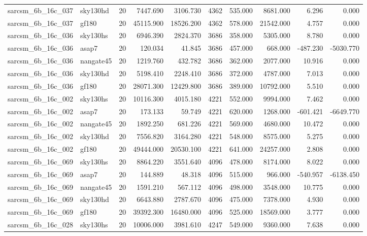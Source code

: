 \begin{longtable}{llrrrrrrrr}
sarcsm\_6b\_16c\_037 & sky130hd & 20 & 7447.690 & 3106.730 & 4362 & 535.000 & 8681.000 & 6.296 & 0.000 \\
sarcsm\_6b\_16c\_037 & gf180 & 20 & 45115.900 & 18526.200 & 4362 & 578.000 & 21542.000 & 4.757 & 0.000 \\
sarcsm\_6b\_16c\_036 & sky130hs & 20 & 6946.390 & 2824.370 & 3686 & 358.000 & 5305.000 & 8.780 & 0.000 \\
sarcsm\_6b\_16c\_036 & asap7 & 20 & 120.034 & 41.845 & 3686 & 457.000 & 668.000 & -487.230 & -5030.770 \\
sarcsm\_6b\_16c\_036 & nangate45 & 20 & 1219.760 & 432.782 & 3686 & 362.000 & 2077.000 & 10.916 & 0.000 \\
sarcsm\_6b\_16c\_036 & sky130hd & 20 & 5198.410 & 2248.410 & 3686 & 372.000 & 4787.000 & 7.013 & 0.000 \\
sarcsm\_6b\_16c\_036 & gf180 & 20 & 28071.300 & 12429.800 & 3686 & 389.000 & 10792.000 & 5.510 & 0.000 \\
sarcsm\_6b\_16c\_002 & sky130hs & 20 & 10116.300 & 4015.180 & 4221 & 552.000 & 9994.000 & 7.462 & 0.000 \\
sarcsm\_6b\_16c\_002 & asap7 & 20 & 173.133 & 59.749 & 4221 & 620.000 & 1268.000 & -601.421 & -6649.770 \\
sarcsm\_6b\_16c\_002 & nangate45 & 20 & 1892.250 & 681.226 & 4221 & 569.000 & 4680.000 & 10.472 & 0.000 \\
sarcsm\_6b\_16c\_002 & sky130hd & 20 & 7556.820 & 3164.280 & 4221 & 548.000 & 8575.000 & 5.275 & 0.000 \\
sarcsm\_6b\_16c\_002 & gf180 & 20 & 49444.000 & 20530.100 & 4221 & 641.000 & 24257.000 & 2.808 & 0.000 \\
sarcsm\_6b\_16c\_069 & sky130hs & 20 & 8864.220 & 3551.640 & 4096 & 478.000 & 8174.000 & 8.022 & 0.000 \\
sarcsm\_6b\_16c\_069 & asap7 & 20 & 144.889 & 48.318 & 4096 & 515.000 & 966.000 & -540.957 & -6138.450 \\
sarcsm\_6b\_16c\_069 & nangate45 & 20 & 1591.210 & 567.112 & 4096 & 498.000 & 3548.000 & 10.775 & 0.000 \\
sarcsm\_6b\_16c\_069 & sky130hd & 20 & 6643.880 & 2787.670 & 4096 & 475.000 & 7378.000 & 4.930 & 0.000 \\
sarcsm\_6b\_16c\_069 & gf180 & 20 & 39392.300 & 16480.000 & 4096 & 525.000 & 18569.000 & 3.777 & 0.000 \\
sarcsm\_6b\_16c\_028 & sky130hs & 20 & 10006.000 & 3981.610 & 4247 & 549.000 & 9360.000 & 7.638 & 0.000 \\

\end{longtable}
